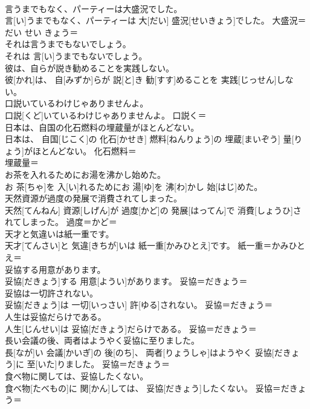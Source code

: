 \documentclass[8pt]{extreport}
\begin{document}
\begin{CJK}{UTF8}{min}
\\	言うまでもなく、パーティーは大盛況でした。	
\\	言[い]うまでもなく、パーティーは 大[だい] 盛況[せいきょう]でした。	大盛況＝だい せい きょう＝　
\\	それは言うまでもないでしょう。	
\\	それは 言[い]うまでもないでしょう。	
\\	彼は、自らが説き勧めることを実践しない。	
\\	彼[かれ]は、 自[みずか]らが 説[と]き 勧[すす]めることを 実践[じっせん]しない。	
\\	口説いているわけじゃありませんよ。	
\\	口説[くど]いているわけじゃありませんよ。	口説く＝ 
\\	日本は、自国の化石燃料の埋蔵量がほとんどない。	
\\	日本は、 自国[じこく]の 化石[かせき] 燃料[ねんりょう]の 埋蔵[まいぞう] 量[りょう]がほとんどない。	化石燃料＝ 
\\	埋蔵量＝ 
\\	お茶を入れるためにお湯を沸かし始めた。	
\\	お 茶[ちゃ]を 入[い]れるためにお 湯[ゆ]を 沸[わ]かし 始[はじ]めた。	
\\	天然資源が過度の発展で消費されてしまった。	
\\	天然[てんねん] 資源[しげん]が 過度[かど]の 発展[はってん]で 消費[しょうひ]されてしまった。	過度＝かど＝ 
\\	天才と気違いは紙一重です。	
\\	天才[てんさい]と 気違[きちが]いは 紙一重[かみひとえ]です。	紙一重＝かみひとえ＝ 
\\	妥協する用意があります。	
\\	妥協[だきょう]する 用意[ようい]があります。	妥協＝だきょう＝ 
\\	妥協は一切許されない。	
\\	妥協[だきょう]は 一切[いっさい] 許[ゆる]されない。	妥協＝だきょう＝ 
\\	人生は妥協だらけである。	
\\	人生[じんせい]は 妥協[だきょう]だらけである。	妥協＝だきょう＝ 
\\	長い会議の後、両者はようやく妥協に至りました。	
\\	長[なが]い 会議[かいぎ]の 後[のち]、 両者[りょうしゃ]はようやく 妥協[だきょう]に 至[いた]りました。	妥協＝だきょう＝ 
\\	食べ物に関しては、妥協したくない。	
\\	食べ物[たべもの]に 関[かん]しては、 妥協[だきょう]したくない。	妥協＝だきょう＝ 

\end{CJK}
\end{document}

